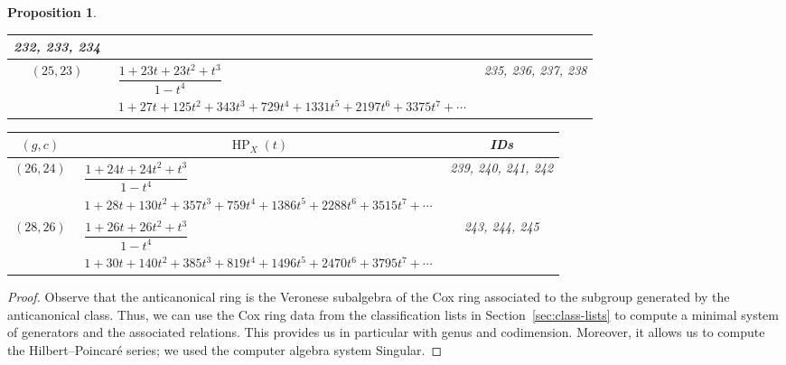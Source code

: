 \documentclass[pdftex]{sigma}%
\newtheorem{prop}[thm]{Proposition}
\theoremstyle{definition}
\DeclareMathOperator\HP{HP}
\numberwithin{equation}{section}
\begin{document}
\begin{prop}
\begin{table}[h!]
\begin{tabu}{c|c|c}
\begin{minipage}{4cm}
 \rm
 	232, 233, 234
 \end{minipage}
	\\ \hline
	$(25,23)$\label{T(23,25)}
	&
	$\begin{array}{c}
	 \dfrac{1\!+\!23t\!+\!23t^2\!+\!t^3}{1-t^4} \\[3pt]
	 {1\!+\!27t\!+\!125t^2\!+\!343t^3\!+\!729t^4\!+\!1331t^5\!+\!2197t^6\!+\!3375t^7\!+\!\cdots}
	\end{array}$
	&
	 \begin{minipage}{4cm}
 \rm
 	235, 236, 237, 238
 \end{minipage}
	\\ \hline
\end{tabu}\vspace{4mm}
\end{table}

\begin{table}[h!]\centering\setlength{\tabcolsep}{3.5pt}
\renewcommand{\arraystretch}{1.45}\small\tabulinesep=1mm
\begin{tabu}{c|c|c}\hline
 $(g,c)$ & $\HP_X(t)$ & {\rm IDs}
 \\
 \hline
$(26,24)$\label{T(24,26)}
	&
	$\begin{array}{c}
	 \dfrac{1\!+\!24t\!+\!24t^2\!+\!t^3}{1-t^4} \\[3pt]
	 {1\!+\!28t\!+\!130t^2\!+\!357t^3\!+\!759t^4\!+\!1386t^5\!+\!2288t^6\!+\!3515t^7\!+\!\cdots}
	\end{array}$
	&
	 \begin{minipage}{4cm}
 \rm
 	239, 240, 241, 242
 \end{minipage}
	\\
\hline	
$(28,26)$\label{T(26,28)}
	&
	$\begin{array}{c}
	 \dfrac{1\!+\!26t\!+\!26t^2\!+\!t^3}{1-t^4} \\[3pt]
	 {1\!+\!30t\!+\!140t^2\!+\!385t^3\!+\!819t^4\!+\!1496t^5\!+\!2470t^6\!+\!3795t^7\!+\!\cdots}
	\end{array}$
	&
	 \begin{minipage}{4cm}
 \rm
 	243, 244, 245
 \end{minipage}
	\\
\hline
\end{tabu}%
\end{table}
\end{prop}



\begin{proof}
Observe that the anticanonical ring is the Veronese subalgebra
of the Cox ring associated to the subgroup generated by the
anticanonical class.
Thus, we can use the Cox ring data from the classification lists
in Section~\ref{sec:class-lists} to compute a minimal system of
generators and the associated relations.
This provides us in particular with genus and codimension.
Moreover, it allows us to compute the Hilbert--Poincar\'{e}
series; we used the computer algebra system Singular.
\end{proof}
\end{document}

